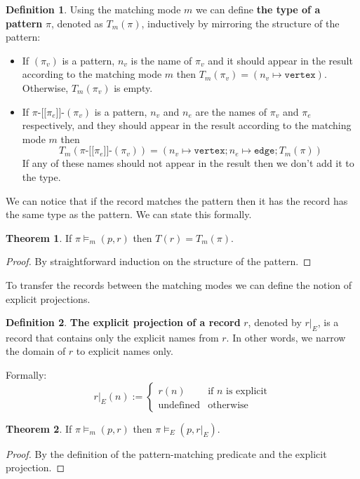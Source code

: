 \documentclass[14pt]{constructor-thesis}
\theoremstyle{definition}
\newtheorem*{theorem}{Theorem}
\newtheorem*{definition}{Definition}
\newcommand{\patternstart}[1]{(#1)}
\newcommand{\patternhop}[3]{#1 \texttt{-[[} #2 \texttt{]]-} (#3)}
\begin{document}
\begin{definition}
  Using the matching mode $m$ we can define \textbf{the type of a pattern} $\pi$, denoted as $T_m(\pi)$, inductively by mirroring the structure of the pattern:
  \begin{itemize}
    \item If $\patternstart{\pi_v}$ is a pattern, $n_v$ is the name of $\pi_v$ and it should appear in the result according to the matching mode $m$ then $T_m \patternstart{\pi_v} = (n_v \mapsto \texttt{vertex})$. Otherwise, $T_m \patternstart{\pi_v}$ is empty.
    \item If $\patternhop{\pi}{\pi_e}{\pi_v}$ is a pattern, $n_v$ and $n_e$ are the names of $\pi_v$ and $\pi_e$ respectively, and they should appear in the result according to the matching mode $m$ then
    $$T_m(\patternhop{\pi}{\pi_e}{\pi_v}) = (n_v \mapsto \texttt{vertex}; n_e \mapsto \texttt{edge}; T_m(\pi))$$ 
    If any of these names should not appear in the result then we don't add it to the type.
  \end{itemize}
\end{definition}

We can notice that if the record matches the pattern then it has the record has the same type as the pattern. We can state this formally.
\begin{theorem}
  If $\pi \models_m (p, r)$ then $T(r) = T_m(\pi)$.
\end{theorem}
\begin{proof}
  By straightforward induction on the structure of the pattern.
\end{proof}

To transfer the records between the matching modes we can define the notion of explicit projections.

\begin{definition}
  \textbf{The explicit projection of a record} $r$, denoted by $r |_E$, is a record that contains only the explicit names from $r$. In other words, we narrow the domain of $r$ to explicit names only.

  Formally:
  $$ r|_E(n) :=
    \begin{cases}
      r(n) & \text{if $n$ is explicit} \\
      \text{undefined} & \text{otherwise}
    \end{cases} $$
\end{definition}

\begin{theorem}
  If $\pi \models_m (p, r)$ then $\pi \models_E (p, r |_E)$.
\end{theorem}
\begin{proof}
  By the definition of the pattern-matching predicate and the explicit projection.
\end{proof}
\end{document}
